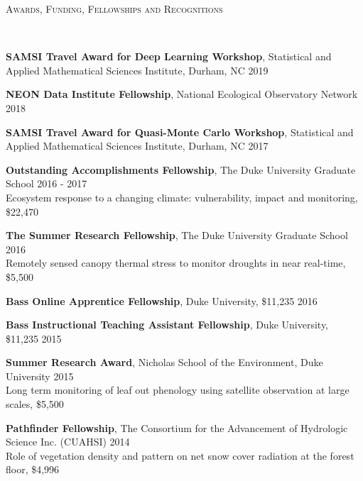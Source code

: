 \documentclass[10pt]{article}
\newenvironment{changemargin}[2]{%
  \begin{list}{}{%
 \setlength{\topsep}{0pt}%
 \setlength{\leftmargin}{#1}%
 \setlength{\rightmargin}{#2}%
 \setlength{\listparindent}{\parindent}%
 \setlength{\itemindent}{\parindent}%
 \setlength{\parsep}{\parskip}%
  }%
  \item[]}{\end{list}
}
\newcommand{\lineover}{
  \begin{changemargin}{-0.05in}{-0.05in}
  \vspace*{-8pt}
  \hrulefill \\
  \vspace*{-2pt}
  \end{changemargin}
}
\newcommand{\header}[1]{
  \begin{changemargin}{-0.5in}{-0.5in}
  \scshape{#1}\\
  \lineover
  \end{changemargin}
}
\newenvironment{body} {
  \vspace*{-2pt}
  \begin{changemargin}{-0.5in}{-0.5in}
}
{\end{changemargin}
}
\begin{document}
\header{Awards, Funding, Fellowships and Recognitions}

\begin{body}

  \textbf{SAMSI Travel Award for Deep Learning Workshop}, Statistical and Applied Mathematical Sciences Institute, Durham, NC \hfill {2019}\\
  \medskip

  \textbf{NEON Data Institute Fellowship}, National Ecological Observatory Network  \hfill {2018}\\
  \medskip

  \textbf{SAMSI Travel Award for Quasi-Monte Carlo Workshop}, Statistical and Applied Mathematical Sciences Institute, Durham, NC \hfill {2017}\\
  \medskip

  \textbf{Outstanding Accomplishments Fellowship}, The Duke University Graduate School \hfill {2016 - 2017}\\
  Ecosystem response to a changing climate: vulnerability, impact and monitoring, \$22,470 \\
  \medskip

  \textbf{The Summer Research Fellowship}, The Duke University Graduate School \hfill {2016}\\
  Remotely sensed canopy thermal stress to monitor droughts in near real-time, \$5,500 \\
  \medskip

  \textbf{Bass Online Apprentice Fellowship}, Duke University, \$11,235 \hfill {2016}\\
  \medskip

  \textbf{Bass Instructional Teaching Assistant Fellowship}, Duke University, \$11,235 \hfill {2015}\\
  \medskip

  \textbf{Summer Research Award}, Nicholas School of the Environment, Duke University \hfill {2015}\\
  Long term monitoring of leaf out phenology using satellite observation at large scales, \$5,500 \\
  \medskip

  \textbf{Pathfinder Fellowship}, The Consortium for the Advancement of Hydrologic Science Inc. (CUAHSI)  \hfill {2014}\\
  Role of vegetation density and pattern on net snow cover radiation at the forest floor, \$4,996\\
  \medskip


\end{body}
\end{document}

